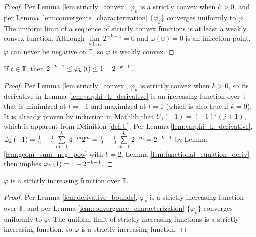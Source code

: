 \begin{proof}
  Per Lemma \ref{lem:strictly_convex}, $\varphi_k$ is a strictly convex when $k > 0$, and per Lemma \ref{lem:convergence_characterization} $\{\varphi_k\}$ converges uniformly to $\varphi$. The uniform limit of a sequence of strictly convex functions is at least a weakly convex function. Although $\lim\limits_{k \uparrow \infty} 2^{-k - 1} = 0$ and $\ddot{\varphi}\left(0\right) = 0$ is an inflection point, $\ddot{\varphi}$ can never be negative on $\mathbb{T}$, so $\varphi$ is weakly convex.
\end{proof}

\begin{lemma}[]
  \label{lem:derivative_bounds}
   If $t \in \mathbb{T}$, then $2^{-k - 1} \leq \dotvarphi[t]{k} \leq 1 - 2^{-k - 1}$.
\end{lemma}
\begin{proof}
  Per Lemma \ref{lem:strictly_convex}, $\varphi_k$ is strictly convex when $k > 0$, so its derivative in Lemma \ref{lem:varphi_k_derivative} is an increasing function over $\mathbb{T}$ that is minimized at $t = -1$ and maximized at $t = 1$ (which is also true if $k = 0$). It is already proven by induction in Mathlib that $U_j\left(-1\right) = \left(-1\right)^j \left(j + 1\right)$, which is apparent from Definition \ref{def:U}. Per Lemma \ref{lem:varphi_k_derivative}, $\dotvarphi[-1]{k} = \frac{1}{2} - \frac{1}{2} \sum\limits_{m = 1}^k 4^{-m} 2^m = \frac{1}{2} - \frac{1}{2} \sum\limits_{m = 1}^k 2^{-m} = 2^{-k - 1}$ by Lemma \ref{lem:geom_sum_neg_pow} with $b = 2$. Lemma \ref{lem:functional_equation_deriv} then implies $\dotvarphi[1]{k} = 1 - 2^{-k - 1}$.
\end{proof}

\begin{lemma}
  \label{lem:increasing}
  $\varphi$ is a strictly increasing function over $\mathbb{T}$.
\end{lemma}

\begin{proof}
  Per Lemma \ref{lem:derivative_bounds}, $\varphi_k$ is a strictly increasing function over $\mathbb{T}$, and per Lemma \ref{lem:convergence_characterization} $\{\varphi_k\}$ converges uniformly to $\varphi$. The uniform limit of strictly increasing functions is a strictly increasing function, so $\varphi$ is a strictly increasing function.
\end{proof}

